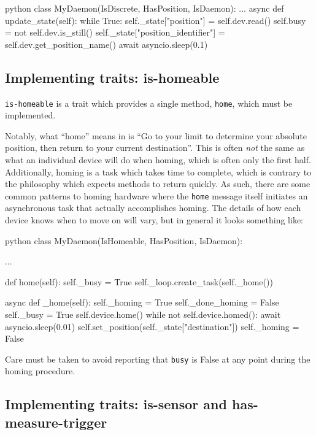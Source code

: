 \begin{codefragment}{python}
class MyDaemon(IsDiscrete, HasPosition, IsDaemon):
    ...
    async def update_state(self):
        while True:
            self._state["position"] = self.dev.read()
            self.busy = not self.dev.is_still()
            self._state["position_identifier"] = self.dev.get_position_name()
            await asyncio.sleep(0.1)
\end{codefragment}

\subsection{Implementing traits: is-homeable}

\texttt{is-homeable} is a trait which provides a single method, \texttt{home}, which must be implemented.

Notably, what ``home'' means in \yaq{} is ``Go to your limit to determine your absolute position, then return to your current destination''.
This is often \textit{not} the same as what an individual device will do when homing, which is often only the first half.
Additionally, homing is a task which takes time to complete, which is contrary to the \yaq{} philosophy which expects methods to return quickly.
As such, there are some common patterns to homing hardware where the \texttt{home} message itself initiates an asynchronous task that actually accomplishes homing.
The details of how each device knows when to move on will vary, but in general it looks something like:

\begin{codefragment}{python}
class MyDaemon(IsHomeable, HasPosition, IsDaemon):

    ...

    def home(self):
        self._busy = True
        self._loop.create_task(self._home())

    async def _home(self):
        self._homing = True
	self._done_homing = False
        self._busy = True
	self.device.home()
	while not self.device.homed():
            await asyncio.sleep(0.01)
        self.set_position(self._state["destination"])
        self._homing = False
\end{codefragment}

Care must be taken to avoid reporting that \texttt{busy} is False at any point during the homing procedure.

\subsection{Implementing traits: is-sensor and has-measure-trigger}

